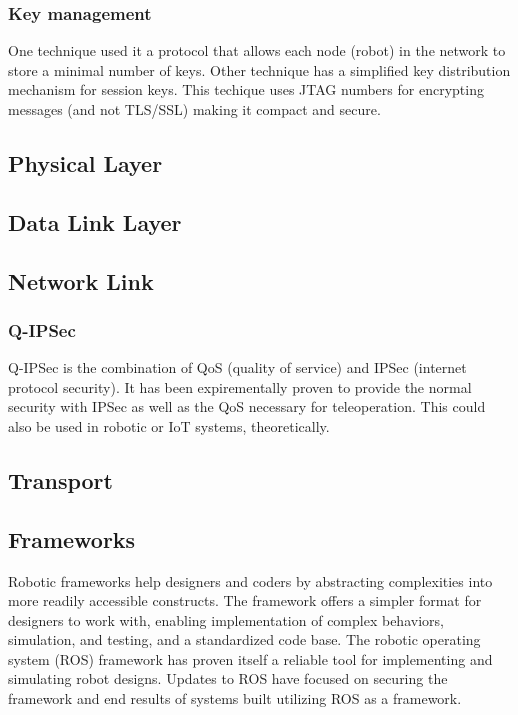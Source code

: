 \subsubsection{Key management}
One technique used it a protocol that allows each node (robot) in the network to store a minimal number of keys\cite{Elgenaidi2016}.
Other technique has a simplified key distribution mechanism for session keys\cite{Qin:2017}. %
This techique uses JTAG numbers for encrypting messages (and not TLS/SSL) making it compact and secure\cite{Yfantis1}.

\subsection{Physical Layer}

\subsection{Data Link Layer}

\subsection{Network Link}

\subsubsection{Q-IPSec} 
Q-IPSec is the combination of QoS (quality of service) and IPSec (internet protocol security)\cite{Kalam2016BilateralTS}. It has been expirementally proven to provide the normal security with IPSec as well as the QoS necessary for teleoperation\cite{Kalam2016BilateralTS}. This could also be used in robotic or IoT systems, theoretically. %

\subsection{Transport}

\subsection{Frameworks}
Robotic frameworks help designers and coders by abstracting complexities into more readily accessible constructs.  The framework offers a simpler format for designers to work with, enabling implementation of complex behaviors, simulation, and testing, and a standardized code base.  The robotic operating system (ROS) framework has proven itself a reliable tool for implementing and simulating robot designs.  Updates to ROS have focused on securing the framework and end results of systems built utilizing ROS as a framework.  

